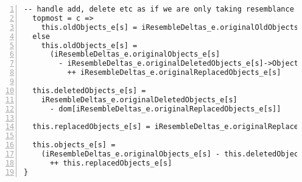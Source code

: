 \begin{lstlisting}[caption={base\_deltas.als}, numbers=left]
  -- handle add, delete etc as if we are only taking resemblance into account
  topmost = c =>
    this.oldObjects_e[s] = iResembleDeltas_e.originalOldObjects_e[s]
  else
    this.oldObjects_e[s] =
      (iResembleDeltas_e.originalObjects_e[s]
        - iResembleDeltas_e.originalDeletedObjects_e[s]->Object)
          ++ iResembleDeltas_e.originalReplacedObjects_e[s]

  this.deletedObjects_e[s] =
    iResembleDeltas_e.originalDeletedObjects_e[s]
      - dom[iResembleDeltas_e.originalReplacedObjects_e[s]]
    
  this.replacedObjects_e[s] = iResembleDeltas_e.originalReplacedObjects_e[s]

  this.objects_e[s] = 
    (iResembleDeltas_e.originalObjects_e[s] - this.deletedObjects_e[s]->Object)
      ++ this.replacedObjects_e[s]
}

\end{lstlisting}
